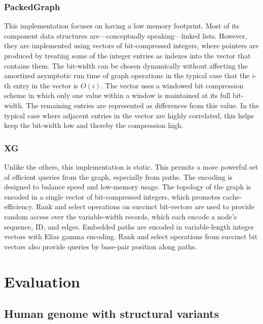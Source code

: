 \documentclass{article}
\begin{document}
\subsubsection{PackedGraph}

This implementation focuses on having a low memory footprint.
Most of its component data structures are---conceptually speaking---linked lists.
However, they are implemented using vectors of bit-compressed integers, where pointers are produced by treating some of the integer entries as indexes into the vector that contains them.
The bit-width can be chosen dynamically without affecting the amortized asymptotic run time of graph operations in the typical case that the $i$-th entry in the vector is $O(i)$.
The vector uses a windowed bit compression scheme in which only one value within a window is maintained at its full bit-width.
The remaining entries are represented as differences from this value.
In the typical case where adjacent entries in the vector are highly correlated, this helps keep the bit-width low and thereby the compression high. 


\subsubsection{XG}

Unlike the others, this implementation is static.
This permits a more powerful set of efficient queries from the graph, especially from paths.
The encoding is designed to balance speed and low-memory usage.
The topology of the graph is encoded in a single vector of bit-compressed integers, which promotes cache-efficiency.
Rank and select operations on succinct bit-vectors are used to provide random access over the variable-width records, which each encode a node's sequence, ID, and edges.
Embedded paths are encoded in variable-length integer vectors with Elias gamma encoding.
Rank and select operations from succinct bit vectors also provide queries by base-pair position along paths.

\section{Evaluation}

\subsection{Human genome with structural variants}
\end{document}
